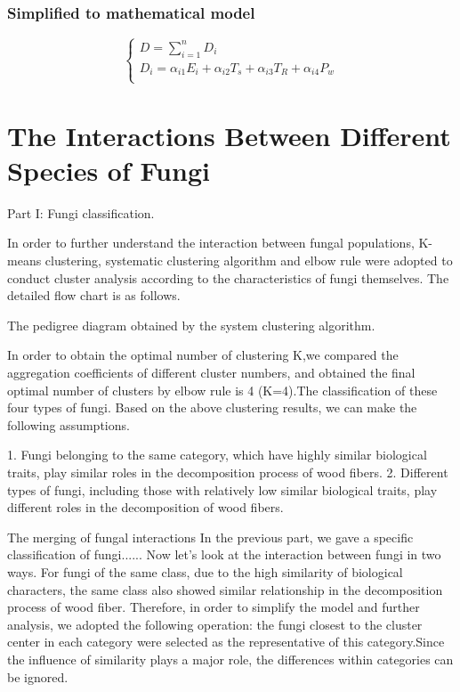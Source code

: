 \documentclass[12pt]{article}
\begin{document}
	\subsubsection{Simplified to mathematical model}
	\begin{equation}
		\begin{cases}
			D=\sum\limits_{i=1}^{n}D_i\\
			D_i=\alpha_{i1} E_i+\alpha_{i2} T_s+\alpha_{i3}T_R+\alpha_{i4}P_w\\
		\end{cases}
	\end{equation}
	
	
	
	
	\section{The Interactions Between Different Species of Fungi}
	Part I: Fungi classification.\par
	In order to further understand the interaction between fungal populations, K-means clustering, systematic clustering algorithm and elbow rule were adopted to conduct cluster analysis according to the characteristics of fungi themselves.
	The detailed flow chart is as follows.\par
	
	
	The pedigree diagram obtained by the system clustering algorithm.\par
	
In order to obtain the optimal number of clustering K,we compared the aggregation coefficients of different cluster numbers, and obtained the final optimal number of clusters by elbow rule is 4 (K=4).The classification of these four types of fungi.
	Based on the above clustering results, we can make the following assumptions.\par
	
	1. Fungi belonging to the same category, which have highly similar biological traits, play similar roles in the decomposition process of wood fibers.
	2. Different types of fungi, including those with relatively low similar biological traits, play different roles in the decomposition of wood fibers.
	
	
	The merging of fungal interactions
	In the previous part, we gave a specific classification of fungi......
	Now let's look at the interaction between fungi in two ways.
	For fungi of the same class, due to the high similarity of biological characters, the same class also showed similar relationship in the decomposition process of wood fiber.
	Therefore, in order to simplify the model and further analysis, we adopted the following operation: the fungi closest to the cluster center in each category were selected as the representative of this category.Since the influence of similarity plays a major role, the differences within categories can be ignored.
	
\end{document}
